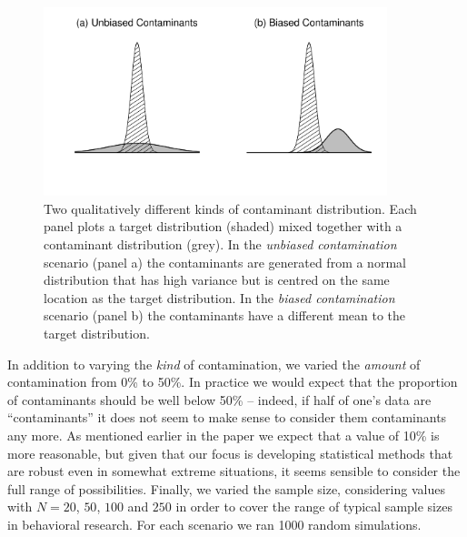 \documentclass[doc]{apa6}
\begin{document}
{\begin{figure}[t]
\centering
\includegraphics[width=10cm]{contaminantTypes.pdf}
\caption{Two qualitatively different kinds of contaminant distribution. Each panel plots a target distribution (shaded) mixed together with a contaminant distribution (grey). In the {\it unbiased contamination} scenario (panel a) the contaminants are generated from a normal distribution that has high variance but is centred on the same location as the target distribution. In the {\it biased contamination} scenario (panel b) the contaminants have a different mean to the target distribution.}
\label{contaminanttypes}
\end{figure}


In addition to varying the {\it kind} of contamination, we varied the {\it amount} of contamination from 0\% to 50\%. In practice we would expect that the proportion of contaminants should be well below 50\% -- indeed, if half of one's data are ``contaminants'' it does not seem to make sense to consider them contaminants any more. As mentioned earlier in the paper we expect that a value of 10\% is more reasonable, but given that our focus is developing statistical methods that are robust even in somewhat extreme situations, it seems sensible to consider the full range of possibilities. Finally, we varied the sample size, considering values with $N=20$, $50$, $100$ and $250$ in order to cover the range of typical sample sizes in behavioral research. For each scenario we ran 1000 random simulations.


}
\end{document}
